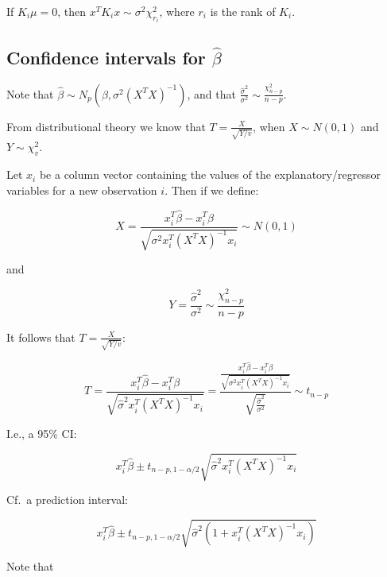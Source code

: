 If $K_i \mu = 0$, then $ x^T K_i x\sim \sigma^2 \chi_{r_i}^2$, where $r_i$ is the rank of $K_i$.

\subsection{Confidence intervals for $\hat{\beta}$}

Note that $\hat{\beta} \sim N_p (\beta,\sigma^2 (X^T X)^{-1})$, and that 
$\frac{\hat{\sigma}^2}{\sigma^2} \sim  \frac{\chi^2_{n-p}}{n-p}$.

From distributional theory we know that $T=\frac{X}{\sqrt{Y/v}}$, when $X\sim N(0,1)$ and $Y\sim \chi^2_{v}$. 

Let 
 $x_i$ be a column vector containing the values of the explanatory/regressor variables for a new observation $i$. Then if we define:

\begin{equation}
X=\frac{x_i^T \hat{\beta} - x_i^T \beta}{\sqrt{\sigma^2 x_i^T (X^T X)^{-1}x_i}} \sim N(0,1)
\end{equation}

\noindent
and 

\begin{equation}
Y=\frac{\hat{\sigma}^2}{\sigma^2} \sim  \frac{\chi^2_{n-p}}{n-p}
\end{equation}


It follows that  $T=\frac{X}{\sqrt{Y/v}}$:

\begin{equation}
T=  \frac{x_i^T \hat{\beta} - x_i^T \beta}{\sqrt{\hat{\sigma}^2 x_i^T (X^T X)^{-1}x_i}} = 
\frac{  \frac{x_i^T \hat{\beta} - x_i^T \beta}{\sqrt{\sigma^2 x_i^T (X^T X)^{-1}x_i}}}{\sqrt{\frac{\hat{\sigma}^2}{\sigma^2}}}
 \sim t_{n-p}
\end{equation}

I.e., a 95\% CI:

\begin{equation}
x_i^T \hat{\beta} \pm t_{n-p,1-\alpha/2}\sqrt{\hat{\sigma}^2 x_i^T(X^T X)^{-1}x_i}
\end{equation}

Cf.\ a prediction interval:

\begin{equation}
x_i^T \hat{\beta} \pm t_{n-p,1-\alpha/2}\sqrt{\hat{\sigma}^2 (1+x_i^T(X^T X)^{-1}x_i)}
\end{equation}

Note that 

